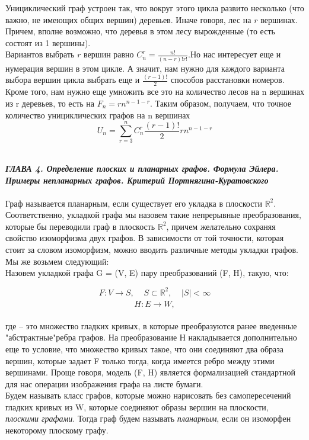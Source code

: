 \documentclass[12pt]{article}
\begin{document}
Унициклический граф устроен так, что вокруг этого цикла развито несколько (что важно, не имеющих общих вершин) деревьев. Иначе говоря, лес на \(\mathit{r}\) вершинах. Причем, вполне возможно, что деревья в этом лесу вырожденные (то есть состоят из 1 вершины).\\

Вариантов выбрать \(\mathit{r}\) вершин равно \(\mathit{C_{n}^{r} = \frac{n!}{(n-r)!r!}}\).Но нас интересует еще и нумерация вершин в этом цикле. А значит, нам нужно для каждого варианта выбора вершин цикла выбрать еще и \(\frac{(r-1)!}{2}\) способов расстановки номеров. Кроме того, нам нужно еще умножить все это на количество лесов на n вершинах из r деревьев, то есть на \(\mathit{F_{n} = rn^{n - 1 - r}}\). Таким образом, получаем, что точное количество унициклических графов на n вершинах $$\mathit{U_{n} = \sum_{r = 3}^{n}{C_{n}^{r}\frac{(r-1)!}{2}rn^{n - 1 - r}}}$$
  
\newpage
\\
\textbf{\textit{ГЛАВА 4. Определение плоских и планарных графов. Формула Эйлера. Примеры непланарных графов. Критерий Портнягина-Куратовского}}
\\
\\

Граф называется планарным, если существует его укладка в плоскости \(\mathbb{R}^2\). Соответственно, укладкой графа мы назовем такие непрерывные преобразования, которые бы переводили граф в плоскость \(\mathbb{R}^2\), причем желательно сохраняя свойство изоморфизма двух графов. В зависимости от той точности, которая стоит за словом изоморфизм, можно вводить различные методы укладки графов. Мы же возьмем следующий: \\

Назовем укладкой графа G = (V, E) пару преобразований (F, H), такую, что:

$$\mathit{F: V \xrightarrow[]{} S,\;\;\;\;S \subset \mathbb{R}}^2,\;\;\;\;|S| < \infty$$
$$\mathit{H: E \xrightarrow[]{} W,}$$ 

где  -- это множество гладких кривых, в которые преобразуются ранее введенные "абстрактные"\;ребра графов. На преобразование Н накладывается дополнительно еще то условие, что множество кривых такое, что они соединяют два образа вершин, которые задает F только тогда, когда имеется ребро между этими вершинами. Проще говоря, модель (F, H) является формализацией стандартной для нас операции изображения графа на листе бумаги.\\

Будем называть класс графов, которые можно нарисовать без самопересечений гладких кривых из W, которые соединяют образы вершин на плоскости, \textit{плоскими графами}. Тогда граф будем называть \textit{планарным}, если он изоморфен некоторому плоскому графу.\\
\end{document}
